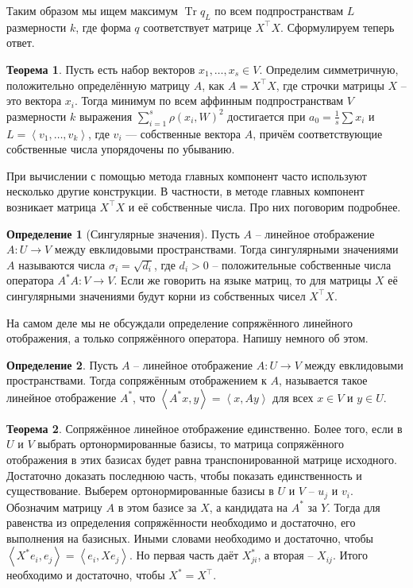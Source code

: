 \documentclass[10pt,a4paper,oneside]{book}
\theoremstyle{definition}
\newtheorem*{defn}{{\color{yellow!30!red} Определение}}
\newtheorem{thm}{{\color{red!40!black} Теорема}}
\newcommand{\Tr}{\operatorname{Tr}}
\def\lan{\left\langle }
\def\ran{\right\rangle}
\def\thrm{\begin{thm}}
\def\ethrm{\end{thm}}
\def\dfn{\begin{defn}}
\def\edfn{\end{defn}}
\begin{document}
Таким образом мы ищем максимум $\Tr q_{L}$ по всем подпространствам $L$ размерности $k$, где форма $q$ соответствует матрице $X^{\top} X$. 
Сформулируем теперь ответ. 


\thrm  Пусть есть набор векторов $x_1,\dots,x_s \in V$. Определим симметричную, положительно определённую матрицу $A$, как $A=X^{\top}X$, где строчки матрицы $X$ -- это вектора $x_i$. Тогда минимум по всем аффинным подпространствам $V$ размерности $k$ выражения $\sum_{i=1}^s \rho(x_i,W)^2$ достигается при $a_0=\frac{1}{s}\sum x_i$  и $L=\lan v_1,\dots,v_k\ran$, где $v_i$ --- собственные вектора $A$, причём соответствующие собственные числа упорядочены по убыванию. 
\ethrm

При вычислении с помощью метода главных компонент часто используют несколько другие конструкции. В частности, в методе главных компонент возникает матрица $X^{\top}X$ и её собственные числа. Про них поговорим подробнее.

\dfn[Сингулярные значения] Пусть $A$ -- линейное отображение $A\colon U \to V$ между евклидовыми пространствами. Тогда сингулярными значениями $A$ называются числа $\sigma_i=\sqrt{d_i}$, где $d_i>0$ -- положительные собственные числа оператора $A^*A \colon V \to V$. Если же говорить на языке матриц, то для матрицы $X$ её сингулярными значениями будут корни из собственных чисел $X^{\top}X$. 
\edfn

На самом деле мы не обсуждали определение сопряжённого линейного отображения, а только сопряжённого оператора. Напишу немного об этом.

\dfn Пусть $A$ -- линейное отображение $A\colon U \to V$ между евклидовыми пространствами. Тогда сопряжённым отображением к $A$, называется такое линейное отображение $A^{*}$, что $\lan A^*x,y\ran = \lan x,Ay\ran$ для всех $x\in V$ и $y \in U$.
\edfn

\thrm Сопряжённое линейное отображение единственно. Более того, если в $U$ и $V$ выбрать ортонормированные базисы, то матрица сопряжённого отображения в этих базисах будет равна транспонированной матрице исходного.
\proof Достаточно доказать последнюю часть, чтобы показать единственность и существование. Выберем ортонормированные базисы в $U$ и $V$ -- $u_j$ и $v_i$. Обозначим матрицу $A$ в этом базисе за $X$, а кандидата на $A^*$ за $Y$. Тогда для равенства из определения сопряжённости необходимо и достаточно, его выполнения на базисных. Иными словами необходимо и достаточно, чтобы $\lan X^{*}e_i,e_j\ran=\lan e_i,Xe_j\ran$. Но первая часть даёт $X^{*}_{ji}$, а вторая -- $X_{ij}$. Итого необходимо и достаточно, чтобы $X^{*}=X^{\top}$.   
\endproof
\ethrm
\end{document}
